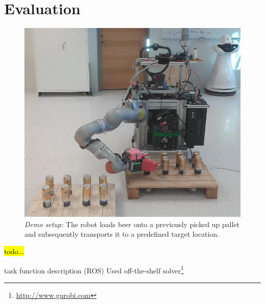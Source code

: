 \section{Evaluation}
\label{sec:eval}
%
\begin{figure}[t!]
\begin{center}
\includegraphics[width =1\linewidth]{figs/demo}
\caption{\textit{Demo setup:} The robot loads beer onto a previously picked up pallet and
  subsequently transports it to a predefined target location.}
\label{fig:demo_setup}
\vspace{-0.65cm}
\end{center}
\end{figure}
%
\hl{todo...}

\cite{Kano09} task function description \cite{Quig09}(ROS) Used off-the-shelf
solver\footnote{\url{http://www.gurobi.com}}
